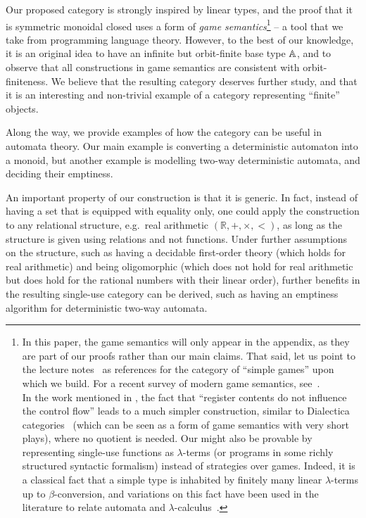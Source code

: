 Our proposed category is strongly inspired by linear types, and the proof that it is symmetric monoidal closed uses a form of \emph{game semantics}\footnote{In this paper, the game semantics will only appear in the appendix, as they are part of our proofs rather than our main claims. That said, let us point to the lecture notes~\cite{abramsky2013semantics,Hyland1997} as references for the category of ``simple games'' upon which we build. For a recent survey of modern game semantics, see~\cite{ClairambaultHDR}.\\
  In the work mentioned in , the fact that ``register contents do not influence the control flow'' leads to a much simpler construction, similar to Dialectica categories~\cite{PaivaDialectica} (which can be seen as a form of game semantics with very short plays), where no quotient is needed. Our  might also be provable by representing single-use functions as $\lambda$-terms (or programs in some richly structured syntactic formalism) instead of strategies over games. Indeed, it is a classical fact that a simple type is inhabited by finitely many linear $\lambda$-terms up to $\beta$-conversion, and variations on this fact have been used in the literature to relate automata and $\lambda$-calculus~\cite{IATLC,LambdaTransducer}.} -- a tool that we take from programming language theory. However, to the best of our knowledge, it is an original idea to have an infinite but orbit-finite base type $\mathbb A$, and to observe that all constructions in game semantics are consistent with orbit-finiteness. We believe that the resulting category deserves further study, and that it is an interesting and non-trivial example of a category representing ``finite'' objects.

Along the way, we provide examples of how the category can be useful in automata theory. Our main example is converting a deterministic automaton into a monoid, but another example is modelling two-way deterministic automata, and deciding their emptiness. 

An important property of our construction is that it is generic. In fact, instead of having a set that is equipped with equality only, one could apply the construction to any relational structure, e.g.~real arithmetic $(\mathbb R, +, \times, <)$, as long as the structure is given using relations and not functions. Under further assumptions on the structure, such as having a decidable first-order theory (which holds for real arithmetic) and being oligomorphic (which does not hold for real arithmetic but does hold for the rational numbers with their linear order), further benefits in the resulting single-use category can be derived, such as having an emptiness algorithm for deterministic two-way automata. 

